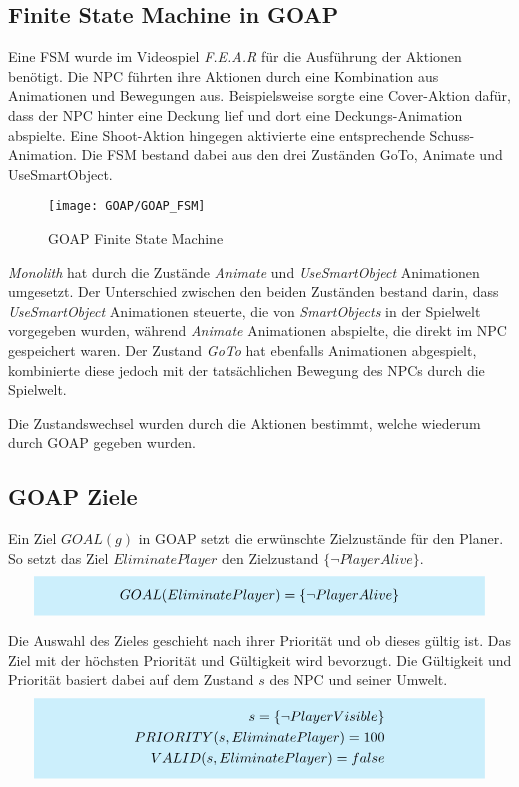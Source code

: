 \subsection{Finite State Machine in GOAP}

Eine FSM wurde im Videospiel \textit{F.E.A.R} für die Ausführung der Aktionen benötigt. Die NPC führten ihre Aktionen durch eine Kombination aus Animationen und Bewegungen aus. Beispielsweise sorgte eine Cover-Aktion dafür, dass der NPC hinter eine Deckung lief und dort eine Deckungs-Animation abspielte. Eine Shoot-Aktion hingegen aktivierte eine entsprechende Schuss-Animation. Die FSM bestand dabei aus den drei Zuständen GoTo, Animate und UseSmartObject. 
\begin{figure}[h]
  \centering
  \texttt{[image: GOAP/GOAP\_FSM]}
	\captionsetup{justification=justified, format=plain}
  \caption{GOAP Finite State Machine}
  \label{GOAP_FSM}
\end{figure}

\textit{Monolith} hat durch die Zustände \textit{Animate} und \textit{UseSmartObject} Animationen umgesetzt. Der Unterschied zwischen den beiden Zuständen bestand darin, dass \textit{UseSmartObject} Animationen steuerte, die von \textit{SmartObjects} in der Spielwelt vorgegeben wurden, während \textit{Animate} Animationen abspielte, die direkt im NPC gespeichert waren. Der Zustand \textit{GoTo} hat ebenfalls Animationen abgespielt, kombinierte diese jedoch mit der tatsächlichen Bewegung des NPCs durch die Spielwelt.

Die Zustandswechsel wurden durch die Aktionen bestimmt, welche wiederum durch GOAP gegeben wurden.


\subsection{GOAP Ziele}

Ein Ziel $GOAL(g)$ in GOAP setzt die erwünschte Zielzustände für den Planer. So setzt das Ziel $EliminatePlayer$ den Zielzustand $\{\lnot PlayerAlive\}$.
\[
	\highlightbox{0.9\textwidth}{$
		\begin{align*}
			GOAL(EliminatePlayer) = \{\lnot PlayerAlive\}
		\end{align*}
	$}
\]

Die Auswahl des Zieles geschieht nach ihrer Priorität und ob dieses gültig ist. Das Ziel mit der höchsten Priorität und Gültigkeit wird bevorzugt. Die Gültigkeit und Priorität basiert dabei auf dem Zustand $s$ des NPC und seiner Umwelt.
\[
	\highlightbox{0.9\textwidth}{$
		\begin{align*}
			s = \{\lnot PlayerVisible\} \\
			PRIORITY(s,EliminatePlayer) = 100 \\
			VALID(s,EliminatePlayer) = false
		\end{align*}
	$}
\]


